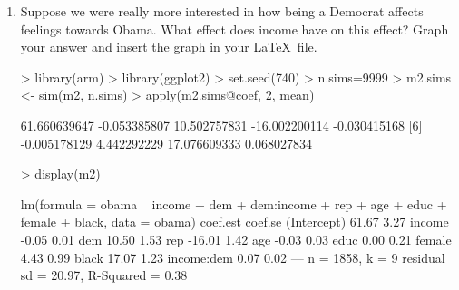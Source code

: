 \documentclass[12pt]{article}
\begin{document}
\begin{enumerate}
\item Suppose we were really more interested in how being a Democrat affects feelings towards Obama.  What effect does income have on this effect?  Graph your answer and insert the graph in your \LaTeX~file.\\

\begin{Schunk}
\begin{Sinput}
> library(arm)
> library(ggplot2)
> set.seed(740)
> n.sims=9999
> m2.sims <- sim(m2, n.sims)
> apply(m2.sims@coef, 2, mean)
\end{Sinput}
\begin{Soutput}
[1]  61.660639647  -0.053385807  10.502757831 -16.002200114  -0.030415168
[6]  -0.005178129   4.442292229  17.076609333   0.068027834
\end{Soutput}
\begin{Sinput}
> display(m2)
\end{Sinput}
\begin{Soutput}
lm(formula = obama ~ income + dem + dem:income + rep + age + 
    educ + female + black, data = obama)
            coef.est coef.se
(Intercept)  61.67     3.27 
income       -0.05     0.01 
dem          10.50     1.53 
rep         -16.01     1.42 
age          -0.03     0.03 
educ          0.00     0.21 
female        4.43     0.99 
black        17.07     1.23 
income:dem    0.07     0.02 
---
n = 1858, k = 9
residual sd = 20.97, R-Squared = 0.38
\end{Soutput}
\end{Schunk}


\end{enumerate}
\end{document}
